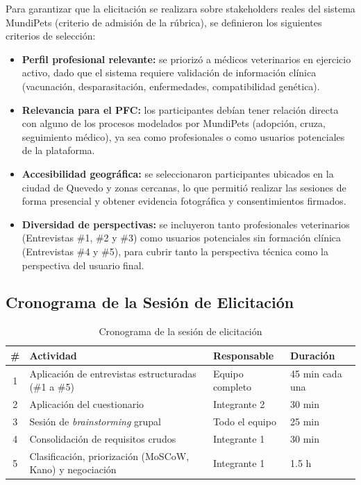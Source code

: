 \documentclass[journal,onecolumn]{IEEEtran}
\begin{document}
Para garantizar que la elicitación se realizara sobre stakeholders reales
del sistema MundiPets (criterio de admisión de la rúbrica), se definieron
los siguientes criterios de selección:

\begin{itemize}[leftmargin=*]
  \item \textbf{Perfil profesional relevante:} se priorizó a médicos
  veterinarios en ejercicio activo, dado que el sistema requiere
  validación de información clínica (vacunación, desparasitación,
  enfermedades, compatibilidad genética).
  \item \textbf{Relevancia para el PFC:} los participantes debían tener
  relación directa con alguno de los procesos modelados por MundiPets
  (adopción, cruza, seguimiento médico), ya sea como profesionales o
  como usuarios potenciales de la plataforma.
  \item \textbf{Accesibilidad geográfica:} se seleccionaron participantes
  ubicados en la ciudad de Quevedo y zonas cercanas, lo que permitió
  realizar las sesiones de forma presencial y obtener evidencia
  fotográfica y consentimientos firmados.
  \item \textbf{Diversidad de perspectivas:} se incluyeron tanto
  profesionales veterinarios (Entrevistas \#1, \#2 y \#3) como usuarios
  potenciales sin formación clínica (Entrevistas \#4 y \#5), para cubrir
  tanto la perspectiva técnica como la perspectiva del usuario final.
\end{itemize}

\subsection{Cronograma de la Sesión de Elicitación}

\begin{table}[H]
\caption{Cronograma de la sesión de elicitación}
\label{tab:cronograma}
\begin{tabularx}{\textwidth}{|c|X|l|l|}
\hline
\textbf{\#} & \textbf{Actividad} & \textbf{Responsable} & \textbf{Duración} \\
\hline
1 & Aplicación de entrevistas estructuradas (\#1 a \#5) & Equipo completo & 45 min cada una \\
\hline
2 & Aplicación del cuestionario & Integrante 2 & 30 min \\
\hline
3 & Sesión de \textit{brainstorming} grupal & Todo el equipo & 25 min \\
\hline
4 & Consolidación de requisitos crudos & Integrante 1 & 30 min \\
\hline
5 & Clasificación, priorización (MoSCoW, Kano) y negociación & Integrante 1 & 1.5 h \\
\hline
\end{tabularx}
\end{table}
\end{document}
